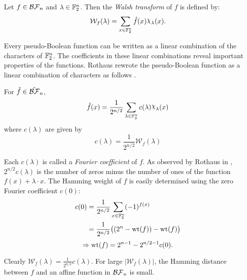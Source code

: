 \begin{definition}\label{def:walsh}
  Let $f\in\mathcal{BF}_n$ and $\lambda\in\mathbb{F}_2^n$. Then the {\em Walsh transform}
  of $f$ is defined by:
  \begin{equation}\label{eqn:walsh}
    \mathcal{W}_f(\lambda)=\sum_{x\in\gftwo^n}\hat{f}(x)\Chi_\lambda(x).
  \end{equation}
\end{definition}

\par Every pseudo-Boolean function can be written as a linear combination of
the characters of $\mathbb{F}_2^n$. The coefficients in these linear combinations
reveal important properties of the functions. Rothaus rewrote the
pseudo-Boolean function as a linear combination of characters
as follows \cite{art:r76}. 

\begin{lemma}
  For $\hat{f}\in\hat{\mathcal{BF}}_n$,
\begin{equation}\label{eqn:rewrite-pseudo}
  \hat{f}(x)
    =\frac{1}{2^{n/2}}
      \sum_{\lambda\in\gftwo^n}c(\lambda)\Chi_\lambda(x)
\end{equation}
  where $c(\lambda)$ are given by
  \begin{equation}\label{eqn:clambda}
    c(\lambda)=\frac{1}{2^{n/2}}\mathcal{W}_f(\lambda)
  \end{equation}
\end{lemma}

\par Each $c(\lambda)$ is called a \textit{Fourier coefficient} of $f$.
As observed by Rothaus in \cite{art:r76}, $2^{n/2}c(\lambda)$ is the
number of zeros minus the number of ones of the function
$f(x)+\lambda\cdot x$. The Hamming weight of $f$ is easily determined using
the zero Fourier coefficient $c(0)$:
\begin{align*}
  c(0)&=\frac{1}{2^{n/2}}\sum_{x\in\mathbb{F}_2^n}(-1)^{f(x)}\\
  &=\frac{1}{2^{n/2}}\big((2^n-{\rm wt}(f))-{\rm wt}(f)\big)
\end{align*}
\begin{equation}
  \Rightarrow {\rm wt}(f)=2^{n-1}-2^{n/2-1}c(0).
\end{equation}

\par Clearly $\mathcal{W}_f(\lambda)=\frac{1}{2^{n/2}}c(\lambda)$. For large
$|\mathcal{W}_f(\lambda)|$, the Hamming distance between $f$ and an affine
function in $\mathcal{BF}_n$ is small.

